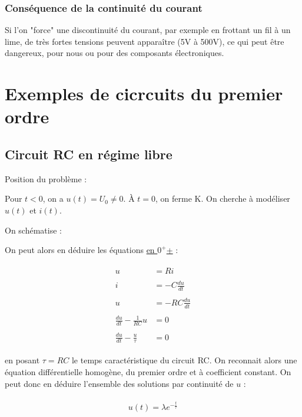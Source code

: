 \documentclass{article}
\begin{document}
\subsubsection{Conséquence de la continuité du courant}

Si l'on "force" une discontinuité du courant, par exemple en frottant un fil à un lime, de très fortes tensions peuvent apparaître (5V à 500V), ce qui peut être dangereux, pour nous ou pour des composants électroniques.

\newpage
{}
\section{Exemples de cicrcuits du premier ordre}

\subsection{Circuit RC en régime libre}

Position du problème :


Pour $t<0$, on a $u(t)=U_0 \neq 0$. À $t=0$, on ferme K. On cherche à modéliser $u(t)$ et $i(t)$.

\bigskip

On schématise :


On peut alors en déduire les équations \underline{en $0^+$+} :

\begin{align*}\begin{split}
u&=Ri\\\\
i&=-C\frac{du}{dt}\\\\
u&=-RC\frac{du}{dt}\\\\
\frac{du}{dt}-\frac{1}{RC}u&=0\\\\
\frac{du}{dt}-\frac{u}{\tau}&=0
\end{split}\end{align*}

en posant $\tau=RC$ le temps caractéristique du circuit RC. On reconnait alors une équation différentielle homogène, du premier ordre et à coefficient constant. On peut donc en déduire l'ensemble des solutions par continuité de $u$ :

\begin{align*}\begin{split}
u(t)=\lambda e^{-\frac{t}{\tau}}
\end{split}\end{align*}
\end{document}
